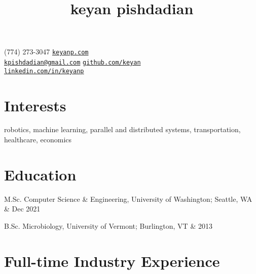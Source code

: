 \documentclass[letterpaper,hidelinks]{scrartcl}
\begin{document}
\title{keyan pishdadian}

(774) 273-3047 \hfill \href{https://keyanp.com}{\texttt{keyanp.com}} \\
\href{mailto:kpishdadian@gmail.com}{\texttt{kpishdadian@gmail.com}} \hfill \href{https://github.com/keyan}{\texttt{github.com/keyan}} \\
\null \hfill \href{https://linkedin.com/in/keyanp}{\texttt{linkedin.com/in/keyanp}}

%
%


\section*{Interests}

robotics, machine learning, parallel and distributed systems, transportation, healthcare, economics

%
%

\section*{Education}

\begin{list1}
  \item\begin{tabular1bold}M.Sc. Computer Science \& Engineering, University of Washington; Seattle, WA & Dec 2021\end{tabular1bold}

  \item\begin{tabular1bold}B.Sc. Microbiology, University of Vermont; Burlington, VT & 2013\end{tabular1bold}
\end{list1}


%
%

\section*{Full-time Industry Experience}
\end{document}
